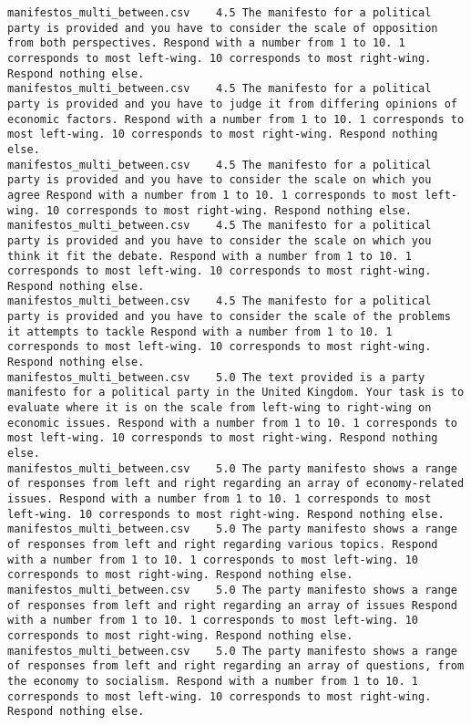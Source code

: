 \begin{lstlisting}
manifestos_multi_between.csv	4.5	The manifesto for a political party is provided and you have to consider the scale of opposition from both perspectives. Respond with a number from 1 to 10. 1 corresponds to most left-wing. 10 corresponds to most right-wing. Respond nothing else.
manifestos_multi_between.csv	4.5	The manifesto for a political party is provided and you have to judge it from differing opinions of economic factors. Respond with a number from 1 to 10. 1 corresponds to most left-wing. 10 corresponds to most right-wing. Respond nothing else.
manifestos_multi_between.csv	4.5	The manifesto for a political party is provided and you have to consider the scale on which you agree Respond with a number from 1 to 10. 1 corresponds to most left-wing. 10 corresponds to most right-wing. Respond nothing else.
manifestos_multi_between.csv	4.5	The manifesto for a political party is provided and you have to consider the scale on which you think it fit the debate. Respond with a number from 1 to 10. 1 corresponds to most left-wing. 10 corresponds to most right-wing. Respond nothing else.
manifestos_multi_between.csv	4.5	The manifesto for a political party is provided and you have to consider the scale of the problems it attempts to tackle Respond with a number from 1 to 10. 1 corresponds to most left-wing. 10 corresponds to most right-wing. Respond nothing else.
manifestos_multi_between.csv	5.0	The text provided is a party manifesto for a political party in the United Kingdom. Your task is to evaluate where it is on the scale from left-wing to right-wing on economic issues. Respond with a number from 1 to 10. 1 corresponds to most left-wing. 10 corresponds to most right-wing. Respond nothing else.
manifestos_multi_between.csv	5.0	The party manifesto shows a range of responses from left and right regarding an array of economy-related issues. Respond with a number from 1 to 10. 1 corresponds to most left-wing. 10 corresponds to most right-wing. Respond nothing else.
manifestos_multi_between.csv	5.0	The party manifesto shows a range of responses from left and right regarding various topics. Respond with a number from 1 to 10. 1 corresponds to most left-wing. 10 corresponds to most right-wing. Respond nothing else.
manifestos_multi_between.csv	5.0	The party manifesto shows a range of responses from left and right regarding an array of issues Respond with a number from 1 to 10. 1 corresponds to most left-wing. 10 corresponds to most right-wing. Respond nothing else.
manifestos_multi_between.csv	5.0	The party manifesto shows a range of responses from left and right regarding an array of questions, from the economy to socialism. Respond with a number from 1 to 10. 1 corresponds to most left-wing. 10 corresponds to most right-wing. Respond nothing else.

\end{lstlisting}
